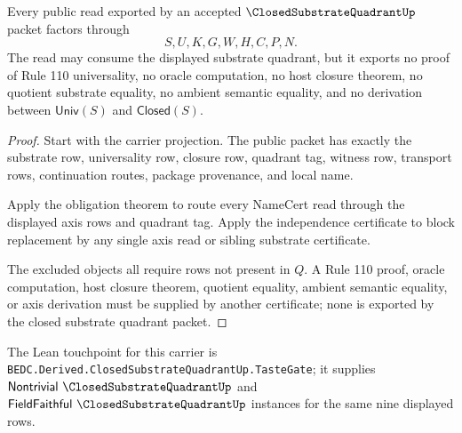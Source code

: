 \begin{theorem}
\label{thm:closed-substrate-quadrant-consumer-boundary}
Every public read exported by an accepted $\ClosedSubstrateQuadrantUp$ packet factors through
$$
S,U,K,G,W,H,C,P,N .
$$
The read may consume the displayed substrate quadrant, but it exports no proof of Rule 110 universality, no oracle computation, no host closure theorem, no quotient substrate equality, no ambient semantic equality, and no derivation between $\mathsf{Univ}(S)$ and $\mathsf{Closed}(S)$.
\end{theorem}
\begin{proof}
Start with the carrier projection. The public packet has exactly the substrate row, universality row, closure row, quadrant tag, witness row, transport rows, continuation routes, package provenance, and local name.

Apply the obligation theorem to route every NameCert read through the displayed axis rows and quadrant tag. Apply the independence certificate to block replacement by any single axis read or sibling substrate certificate.

The excluded objects all require rows not present in $Q$. A Rule 110 proof, oracle computation, host closure theorem, quotient equality, ambient semantic equality, or axis derivation must be supplied by another certificate; none is exported by the closed substrate quadrant packet.
\end{proof}

The Lean touchpoint for this carrier is \texttt{BEDC.Derived.ClosedSubstrateQuadrantUp.TasteGate}; it supplies $\mathsf{Nontrivial}\ \ClosedSubstrateQuadrantUp$ and $\mathsf{FieldFaithful}\ \ClosedSubstrateQuadrantUp$ instances for the same nine displayed rows.


